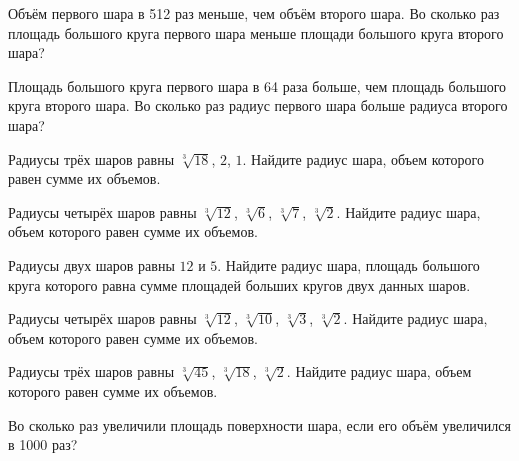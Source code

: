 \documentclass[a4paper]{article}
\begin{document}
\begin{taskBN}{17}
Объём первого шара в 512 раз меньше, чем объём второго шара. Во сколько раз площадь большого круга первого шара меньше площади большого круга второго шара?
\end{taskBN}

\begin{taskBN}{18}
Площадь большого круга первого шара в 64 раза больше, чем площадь большого круга второго шара. Во сколько раз радиус первого шара больше радиуса второго шара?
\end{taskBN}

\begin{taskBN}{19}
Радиусы трёх шаров равны $\sqrt[3]{18}$, $2$, $1$. Найдите радиус шара, объем которого равен сумме их объемов.
\end{taskBN}

\begin{taskBN}{20}
Радиусы четырёх шаров равны $\sqrt[3]{12}$, $\sqrt[3]{6}$, $\sqrt[3]{7}$, $\sqrt[3]{2}$. Найдите радиус шара, объем которого равен сумме их объемов.
\end{taskBN}

\begin{taskBN}{21}
Радиусы двух шаров равны $12$ и $5$. Найдите радиус шара, площадь большого круга которого равна сумме площадей больших кругов двух данных шаров.
\end{taskBN}

\begin{taskBN}{22}
Радиусы четырёх шаров равны $\sqrt[3]{12}$, $\sqrt[3]{10}$, $\sqrt[3]{3}$, $\sqrt[3]{2}$. Найдите радиус шара, объем которого равен сумме их объемов.
\end{taskBN}

\begin{taskBN}{23}
Радиусы трёх шаров равны $\sqrt[3]{45}$, $\sqrt[3]{18}$, $\sqrt[3]{2}$. Найдите радиус шара, объем которого равен сумме их объемов.
\end{taskBN}

\begin{taskBN}{24}
Во сколько раз увеличили площадь поверхности шара, если его объём увеличился в 1000 раз?
\end{taskBN}
\end{document}
